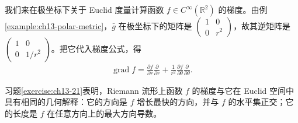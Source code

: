 \documentclass[../../main.tex]{subfiles}
\begin{document}
\begin{example}\label{example:ch13-gradient-polar}
我们来在极坐标下关于 Euclid 度量计算函数 $f\in C^\infty(\mathbb{R}^2)$ 的梯度。由例\ref{example:ch13-polar-metric}，$\bar g$ 在极坐标下的矩阵是 $\begin{pmatrix}1&0\\0&r^2\end{pmatrix}$，故其逆矩阵是 $\begin{pmatrix}1&0\\0&1/r^2\end{pmatrix}$。把它代入梯度公式，得
\begin{align*}
\operatorname{grad}f=\frac{\partial f}{\partial r}\frac{\partial}{\partial r}+\frac1{r^2}\frac{\partial f}{\partial\theta}\frac{\partial}{\partial\theta}.
\end{align*}
\end{example}

习题\ref{exercise:ch13-21}表明，Riemann 流形上函数 $f$ 的梯度与它在 Euclid 空间中具有相同的几何解释：它的方向是 $f$ 增长最快的方向，并与 $f$ 的水平集正交；它的长度是 $f$ 在任意方向上的最大方向导数。
\end{document}
